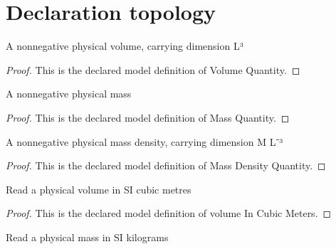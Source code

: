 \section{Declaration topology}
\begin{definition}
  \label{def:physics:phyx-mini-0380:phyxminiproblems-problemphyxmini0380-volumequantity}
  A nonnegative physical volume, carrying dimension L³
\end{definition}
\begin{proof}
  This is the declared model definition of Volume Quantity.
\end{proof}
\begin{definition}
  \label{def:physics:phyx-mini-0380:phyxminiproblems-problemphyxmini0380-massquantity}
  A nonnegative physical mass
\end{definition}
\begin{proof}
  This is the declared model definition of Mass Quantity.
\end{proof}
\begin{definition}
  \label{def:physics:phyx-mini-0380:phyxminiproblems-problemphyxmini0380-massdensityquantity}
  A nonnegative physical mass density, carrying dimension M L⁻³
\end{definition}
\begin{proof}
  This is the declared model definition of Mass Density Quantity.
\end{proof}
\begin{definition}
  \label{def:physics:phyx-mini-0380:phyxminiproblems-problemphyxmini0380-volumeincubicmeters}
  Read a physical volume in SI cubic metres
\end{definition}
\begin{proof}
  This is the declared model definition of volume In Cubic Meters.
\end{proof}
\begin{definition}
  \label{def:physics:phyx-mini-0380:phyxminiproblems-problemphyxmini0380-massinkilograms}
  Read a physical mass in SI kilograms
\end{definition}
